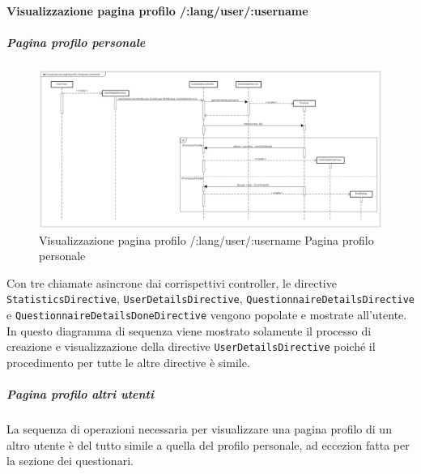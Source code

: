 \paragraph{Visualizzazione pagina profilo /:lang/user/:username }

\subparagraph{Pagina profilo personale}

\label{Visualizzazione pagina profilo /:lang/user/:username Pagina profilo personale}

\begin{figure}[ht]
	\centering
	\includegraphics[scale=0.25,keepaspectratio]{UML/DiagrammiDiSequenza/Front-end/UserPage.png}
	\caption{Visualizzazione pagina profilo /:lang/user/:username Pagina profilo personale}
\end{figure} \FloatBarrier

Con tre chiamate asincrone dai corrispettivi controller, le directive \texttt{StatisticsDirective}, \texttt{UserDetailsDirective}, \texttt{QuestionnaireDetailsDirective} e \texttt{QuestionnaireDetailsDoneDirective} vengono popolate e mostrate all'utente. 
In questo diagramma di sequenza viene mostrato solamente il processo di creazione e visualizzazione della directive \texttt{UserDetailsDirective} poiché il procedimento per tutte le altre directive è simile.

\subparagraph{Pagina profilo altri utenti}

La sequenza di operazioni necessaria per visualizzare una pagina profilo di un altro utente è del tutto simile a quella del profilo personale, ad eccezion fatta per la sezione dei questionari. 
